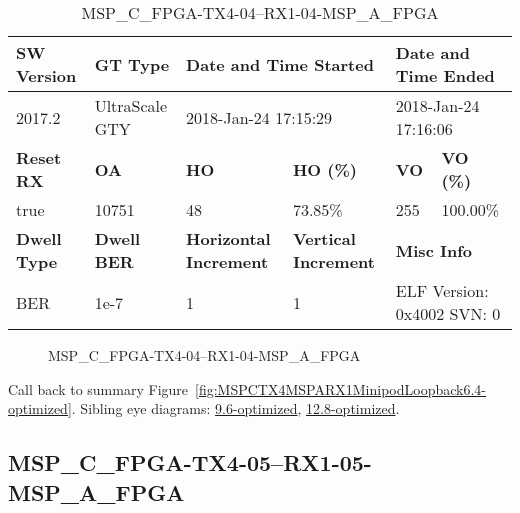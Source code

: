 \begin{table}[h]
\centering
\caption{MSP\_C\_FPGA-TX4-04--RX1-04-MSP\_A\_FPGA}
\label{tab:MSPCFPGATX404RX104MSPAFPGA6.4-optimized}
\begin{tabular}{@{}|l|l|l|l|l|l|@{}}
\toprule
\textbf{SW Version}                & \textbf{GT Type}   & \multicolumn{2}{l|}{\textbf{Date and Time Started}}            & \multicolumn{2}{l|}{\textbf{Date and Time Ended}}        \\ \midrule
2017.2                       & UltraScale GTY          & \multicolumn{2}{l|}{2018-Jan-24 17:15:29}                   & \multicolumn{2}{l|}{2018-Jan-24 17:16:06}               \\ \midrule
\textbf{Reset RX}                  & \textbf{OA} & \textbf{HO}   & \textbf{HO (\%)} & \textbf{VO} & \textbf{VO (\%)} \\ \midrule
true & 10751        & 48          & 73.85\%        & 255        & 100.00\%       \\ \midrule
\textbf{Dwell Type}                & \textbf{Dwell BER} & \textbf{Horizontal Increment} & \textbf{Vertical Increment}    & \multicolumn{2}{l|}{\textbf{Misc Info}}                  \\ \midrule
BER                            & 1e-7        & 1        & 1           & \multicolumn{2}{l|}{ELF Version: 0x4002 SVN: 0}                         \\ \bottomrule
\end{tabular}
\end{table}

\begin{figure}[h]
\caption{MSP\_C\_FPGA-TX4-04--RX1-04-MSP\_A\_FPGA} \label{fig:MSPCFPGATX404RX104MSPAFPGA6.4-optimized}
\end{figure}

Call back to summary Figure~\ref{fig:MSPCTX4MSPARX1MinipodLoopback6.4-optimized}.
Sibling eye diagrams: \hyperref[sec:MSPCFPGATX404RX104MSPAFPGA9.6-optimized]{9.6-optimized}, \hyperref[sec:MSPCFPGATX404RX104MSPAFPGA12.8-optimized]{12.8-optimized}.

\clearpage
\newpage


\subsection{MSP\_C\_FPGA-TX4-05--RX1-05-MSP\_A\_FPGA}\label{sec:MSPCFPGATX405RX105MSPAFPGA6.4-optimized}

